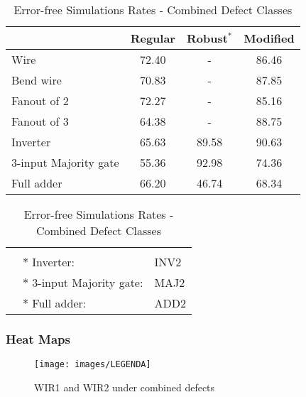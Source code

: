 \begin{table}[h]
\begin{center}
\caption{Error-free Simulations Rates - Combined Defect Classes}
\begin{tabular}{|l|c|c|c|} 
\hline
 					   & Regular & Robust${^\ast}$ & Modified \\
\hline
 Wire                  & 72.40   & -     		   & 86.46 \\
\hline
 Bend wire             & 70.83   & -               & 87.85 \\
\hline
 Fanout of 2           & 72.27   & -               & 85.16 \\
\hline
 Fanout of 3           & 64.38   & -               & 88.75 \\
\hline
 Inverter              & 65.63   & 89.58           & 90.63 \\
\hline
 3-input Majority gate & 55.36   & 92.98           & 74.36 \\
\hline
 Full adder            & 66.20   & 46.74           & 68.34 \\
\hline

\end{tabular}
\end{center}

\begin{tabular}{l l l}
 & & \\
 & $\ast$ Inverter:              & INV2 \cite{beard06}  \\
 & $\ast$ 3-input Majority gate: & MAJ2 \cite{fijany01} \\
 & $\ast$ Full adder:            & ADD2 \cite{roohi15}  \\
 
\end{tabular}
\end{table}


\pagebreak
\subsubsection{Heat Maps}
\flushleft


\begin{figure}[h]
\center
{}
\hfill
{}
\linebreak
{\texttt{[image: images/LEGENDA]}
}
\caption{WIR1 and WIR2 under combined defects}
\label{figure:wire_t1}
\end{figure}

